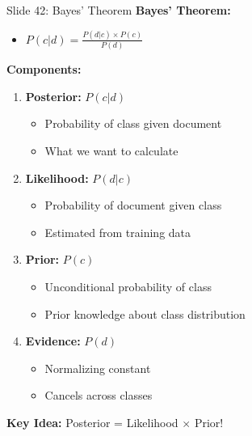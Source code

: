 \documentclass[8pt]{beamer}
\begin{document}
	\begin{frame}{Slide 42: Bayes' Theorem}
		\fontsize{6.5}{7.5}\selectfont
		\textbf{Bayes' Theorem:}
		\begin{itemize}
			\item $P(c|d) = \frac{P(d|c) \times P(c)}{P(d)}$
		\end{itemize}
		
		\vspace{0.1cm}
		\textbf{Components:}
		\begin{enumerate}
			\item \textbf{Posterior:} $P(c|d)$
			\begin{itemize}
				\item Probability of class given document
				\item What we want to calculate
			\end{itemize}
			\item \textbf{Likelihood:} $P(d|c)$
			\begin{itemize}
				\item Probability of document given class
				\item Estimated from training data
			\end{itemize}
			\item \textbf{Prior:} $P(c)$
			\begin{itemize}
				\item Unconditional probability of class
				\item Prior knowledge about class distribution
			\end{itemize}
			\item \textbf{Evidence:} $P(d)$
			\begin{itemize}
				\item Normalizing constant
				\item Cancels across classes
			\end{itemize}
		\end{enumerate}
		
		\textcolor{myblue}{\textbf{Key Idea:}} Posterior = Likelihood $\times$ Prior!
	\end{frame}
	
\end{document}
